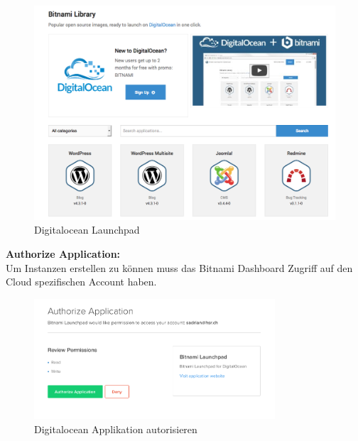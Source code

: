\begin{figure}[!htbp]
\includegraphics[width=\textwidth]{./03_Analyse/03_Bitnami/images/digitalocean_launchpad}
\caption{Digitalocean Launchpad}
\end{figure}

\newpage
\textbf{Authorize Application:}\\
Um Instanzen erstellen zu können muss das Bitnami Dashboard Zugriff auf 
den Cloud spezifischen Account haben.

\begin{figure}[!htbp]
\includegraphics[width=0.8\textwidth]{./03_Analyse/03_Bitnami/images/digitalocean_authorize}
\caption{Digitalocean Applikation autorisieren}
\end{figure}




